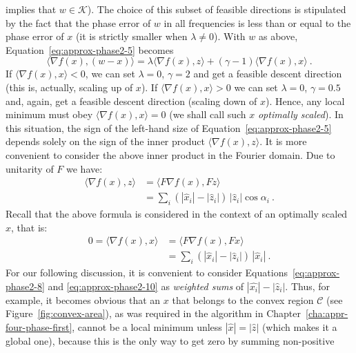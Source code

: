 implies that $w\in \mathcal {K}$). The choice of this subset of
feasible directions is stipulated by the fact that the phase error of
$w$ in all frequencies is less than or equal to the phase error of
$x$ (it is strictly smaller when $\lambda\not=0$). With $w$ as above,
Equation~\eqref{eq:approx-phase2-5} becomes
\begin{equation}
  \label{eq:approx-phase2-6}
  \langle \nabla f(x), (w-x) \rangle =
  \lambda\langle\nabla f(x), z\rangle +
  (\gamma - 1) \langle\nabla f(x),x\rangle\ .
\end{equation}
If $\langle\nabla f(x),x \rangle < 0$, we can set $\lambda=0$,
$\gamma=2$ and get a feasible descent direction (this is, actually,
scaling up of $x$). If  $\langle\nabla f(x),x \rangle > 0$ we can set
$\lambda =0$, $\gamma=0.5$ and, again, get a feasible descent
direction (scaling down of $x$). Hence, any local minimum must
obey $\langle\nabla f(x),x \rangle = 0$ (we shall call such $x$
\textit{optimally scaled}). In this situation, the sign of the
left-hand size of 
Equation~\eqref{eq:approx-phase2-5} depends solely on the sign of the inner product
$\langle\nabla f(x), z\rangle$. It is more convenient to consider the
above inner product in the Fourier domain. Due to unitarity of $F$ we have:
\begin{align}
  \label{eq:approx-phase2-7}
  \langle\nabla f(x), z\rangle
  & = \langle F\nabla f(x), Fz\rangle \\
  & = \sum_{i} (|\hat{x}_{i}|
  -|\hat{z}_{i}|)\,|\hat{z}_{i}|\cos\alpha_{i}\label{eq:approx-phase2-8}
  \ .
\end{align}
Recall that the above formula is considered in
the context of an optimally scaled $x$, that is:
\begin{align}
  \label{eq:approx-phase2-9}
  0 = \langle   \nabla f(x), x\rangle
  & = \langle F \nabla f(x), Fx\rangle \\
  & = \sum_{i} (|\hat{x}_{i}|
  -|\hat{z}_{i}|)\,|\hat{x}_{i}|\label{eq:approx-phase2-10}
  \ .
\end{align}
For our following discussion, it is convenient to consider
Equations~\eqref{eq:approx-phase2-8} and \eqref{eq:approx-phase2-10} as \textit{weighted sums} of
$|\hat{x_{i}}|-|\hat{z}_{i}|$. Thus, for example, it becomes obvious
that an $x$ that belongs to the convex region $\mathcal{C}$ (see
Figure~\ref{fig:convex-area}), as was required in the 
algorithm in Chapter~\ref{cha:appr-four-phase-first}, cannot be a
local minimum unless $|\hat{x}| = |\hat{z}|$ (which makes it a global
one), because this is the only way to get zero by summing non-positive
